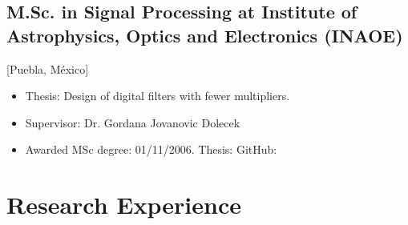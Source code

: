 \documentclass{mycv}
\begin{document}
\subsection{M.Sc. in Signal Processing at Institute of Astrophysics, Optics and Electronics (INAOE)}[Puebla, M\'exico]
\begin{itemize}[label={}]
  \item Thesis: Design of digital filters with fewer multipliers. 
  \item Supervisor: Dr. Gordana Jovanovic Dolecek 
  \item Awarded MSc degree: 01/11/2006.
  	Thesis: \href{https://github.com/mxochicale/publications/blob/master/thesis/M.Sc./doc/MPXochicale_MScThesis-2016.pdf}{\faFilePdfO}
	GitHub: \href{https://github.com/mxochicale/publications/tree/master/thesis/M.Sc.}{\faGithubAlt}
\end{itemize}


\section{Research Experience}
\end{document}
